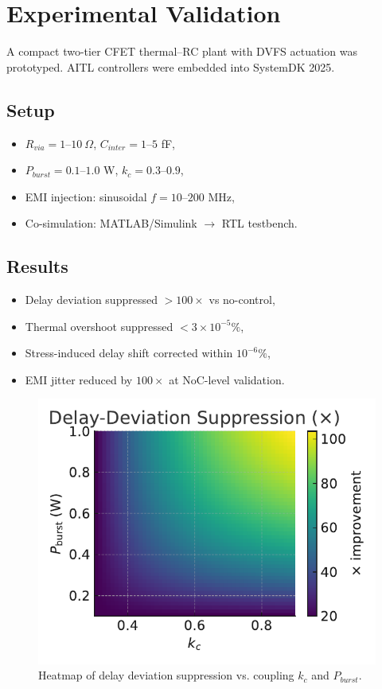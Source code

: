 \documentclass[conference]{IEEEtran}
\begin{document}
\section{Experimental Validation}
A compact two-tier CFET thermal–RC plant with DVFS actuation was prototyped.  
AITL controllers were embedded into SystemDK 2025.

\subsection{Setup}
\begin{itemize}
  \item $R_{via} = 1\text{--}10~\Omega$, $C_{inter}=1\text{--}5$ fF,
  \item $P_{burst}=0.1\text{--}1.0$ W, $k_c=0.3\text{--}0.9$,
  \item EMI injection: sinusoidal $f=10\text{--}200$ MHz,
  \item Co-simulation: MATLAB/Simulink $\to$ RTL testbench.
\end{itemize}

\subsection{Results}
\begin{itemize}
  \item Delay deviation suppressed $>100\times$ vs no-control,
  \item Thermal overshoot suppressed $<3\times 10^{-5}\%$,
  \item Stress-induced delay shift corrected within $10^{-6}\%$,
  \item EMI jitter reduced by $100\times$ at NoC-level validation.
\end{itemize}

\begin{figure}[h]
\centering
\includegraphics[width=0.85\columnwidth]{figs/heatmap_results.pdf}
\caption{Heatmap of delay deviation suppression vs. coupling $k_c$ and $P_{burst}$.}
\label{fig:heatmap}
\end{figure}
\end{document}
